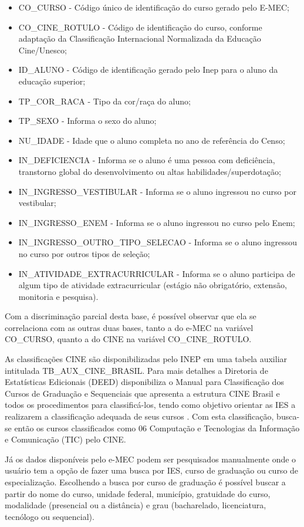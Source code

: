 \begin{itemize}
    \item CO\_CURSO - Código único de identificação do curso gerado pelo E-MEC;
    \item CO\_CINE\_ROTULO - Código de identificação do curso, conforme adaptação da Classificação Internacional Normalizada da Educação Cine/Unesco;
    \item ID\_ALUNO - Código de identificação gerado pelo Inep para o aluno da educação superior;
    \item TP\_COR\_RACA - Tipo da cor/raça do aluno;
    \item TP\_SEXO - Informa o sexo do aluno;
    \item NU\_IDADE - Idade que o aluno completa no ano de referência do Censo;
    \item IN\_DEFICIENCIA - Informa se o aluno é uma pessoa com deficiência, transtorno global do desenvolvimento ou altas habilidades/superdotação;
    \item IN\_INGRESSO\_VESTIBULAR - Informa se o aluno ingressou no curso por vestibular;
    \item IN\_INGRESSO\_ENEM - Informa se o aluno ingressou no curso pelo Enem;
    \item IN\_INGRESSO\_OUTRO\_TIPO\_SELECAO - Informa se o aluno ingressou no curso por outros tipos de seleção;
    \item IN\_ATIVIDADE\_EXTRACURRICULAR - Informa se o aluno participa de algum tipo de atividade extracurricular (estágio não obrigatório, extensão, monitoria e pesquisa).
\end{itemize}

Com a discriminação parcial desta base, é possível observar que ela se correlaciona com as outras duas bases, tanto a do e-MEC na variável CO\_CURSO, quanto a do CINE na variável CO\_CINE\_ROTULO.

As classificações CINE são disponibilizadas pelo INEP em uma tabela auxiliar intitulada TB\_AUX\_CINE\_BRASIL. Para mais detalhes a Diretoria de Estatísticas Edicionais (DEED) disponibiliza o Manual para Classificação dos Cursos de Graduação e Sequenciais que apresenta a estrutura CINE Brasil e todos os procedimentos para classificá-los, tendo como objetivo orientar as IES a realizarem a classificação adequada de seus cursos \cite{CINE}. Com esta classificação, busca-se então os cursos classificados como 06 Computação e Tecnologias da Informação e Comunicação (TIC) pelo CINE.

Já os dados disponíveis pelo e-MEC podem ser pesquisados manualmente onde o usuário tem a opção de fazer uma busca por IES, curso de graduação ou curso de especialização. Escolhendo a busca por curso de graduação é possível buscar a partir do nome do curso, unidade federal, município, gratuidade do curso, modalidade (presencial ou a distância) e grau (bacharelado, licenciatura, tecnólogo ou sequencial).

